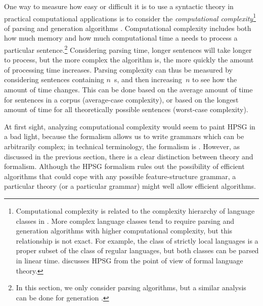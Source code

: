 \documentclass[output=paper
	        ,collection
	        ,collectionchapter
 	        ,biblatex
                ,babelshorthands
                ,newtxmath
                ,draftmode
                ,colorlinks, citecolor=brown
]{langscibook}
\begin{document}

One way to measure how easy or difficult it is
to use a syntactic theory in practical computational applications
is to consider the \textit{computational complexity}\footnote{%
	Computational complexity is related to
	the complexity hierarchy of language classes in .
	More complex language classes tend to require
	parsing and generation algorithms with higher computational complexity,
	but this relationship is not exact.
	For example, the class of strictly local languages is a proper subset of the class of regular languages,
	but both classes can be parsed in linear time.
	\citet[Chapter 17]{MuellerGT-Eng3} discusses HPSG from the point of view of formal language theory.
}
of parsing and generation algorithms \citep{gazdar1985complexity}.
Computational complexity includes both how much memory
and how much computational time
a  needs to process a particular sentence.\footnote{%
  In this section, we only consider parsing
  algorithms, but a similar analysis can be done for generation
  \citep[\eg][]{carroll1999generate}.}
Considering parsing time, longer sentences will take longer to process,
but the more complex the algorithm is,
the more quickly the amount of processing time increases.
Parsing complexity can thus be measured by considering
sentences containing $n$~s,
and then increasing~$n$ to see how the amount of time changes.
This can be done based on the average amount of time
for sentences in a corpus (average-case complexity),
or based on the longest amount of time
for all theoretically possible sentences (worst-case complexity).

At first sight, analyzing computational complexity
would seem to paint HPSG in a bad light,
because the formalism allows us to write grammars
which can be arbitrarily complex;
in technical terminology, the formalism is \textit{}
\citep[Section~3.4]{Johnson88}.
However, as discussed in the previous section,
there is a clear distinction between theory and formalism.
Although the HPSG formalism rules out the possibility of efficient algorithms
that could cope with any possible feature-structure grammar,
a particular theory (or a particular grammar) might well allow efficient algorithms.
\end{document}
